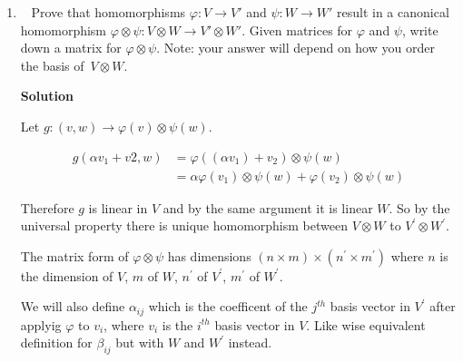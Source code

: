 \documentclass[11pt]{article}
\newcommand\score[1]{\marginpar{\vspace{-2ex}\color{blue}{#1/3}}\hspace{-1ex}}
\newcommand\0{\mathbf{0}}
\newcommand\<{\langle}
\renewcommand\>{\rangle}
\begin{document}
\begin{enumerate}
So we have a function that maps $u\times(v\otimes w)$ to $(u\otimes v)\otimes w$. Since the previous functions we used were 
multilinear then this function itself is multilinear and again we can use the universal property to get a unique mapping 
from $U\otimes (V\otimes W)$ to $(U\otimes V)\otimes W$. Since starting off with $u$ was arbitrary we can reuse the previous steps to 
also make a unique linear mapping in the reverse and therefore the mapping admits an inverse and so there is an isomorphism between them.

\item\ \score{}%
Prove that homomorphisms $\varphi: V \to V'$ and $\psi: W \to W'$
result in a canonical homomorphism $\varphi \otimes \psi: V \otimes W
\to V' \otimes W'$.  Given matrices for $\varphi$ and $\psi$, write
down a matrix for $\varphi \otimes \psi$.  Note: your answer will
depend on how you order the basis of~$V \otimes W$.

\textbf{Solution}


Let $g: (v,w) \rightarrow \varphi(v) \otimes \psi(w)$.

\begin{align*}
  g(\alpha v_{1}+v{2},w)&= \varphi((\alpha v_{1})+v_{2})\otimes \psi (w)\\
  &= \alpha \varphi(v_{1})\otimes \psi(w) + \varphi(v_{2})\otimes \psi(w)
\end{align*}

Therefore $g$ is linear in $V$ and by the same argument it is linear $W$. So by 
the universal property there is unique homomorphism between $V\otimes W$ to 
$V^{'} \otimes W^{'}$.

The matrix form of $\varphi \otimes \psi$ has dimensions $(n \times m) \times (n^{'} \times m^{'})$ 
where $n$ is the dimension of $V$, $m$ of $W$, $n^{'}$ of $V^{'}$, $m^{'}$ of $W^{'}$.

We will also define $\alpha_{ij}$ which is the coefficent of the $j^{th}$ basis vector 
in $V^{'}$ after applyig $\varphi$ to $v_{i}$, where $v_{i}$ is the $i^{th}$ basis 
vector in $V$. Like wise equivalent definition for $\beta_{ij}$ but with $W$ and $W^{'}$ instead.


\end{enumerate}
\end{document}
